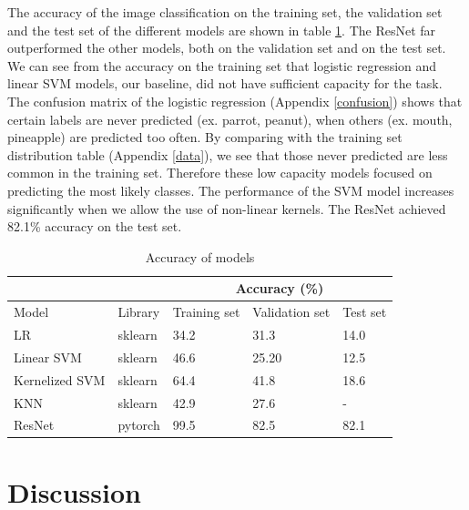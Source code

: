 \documentclass[reqno]{amsart}
\begin{document}
The accuracy of the image classification on the training set, the validation set and the test set of the different models are shown in table \ref{fig:results}. The ResNet far outperformed the other models, both on the validation set and on the test set. We can see from the accuracy on the training set that logistic regression and linear SVM models, our baseline, did not have sufficient capacity for the task. \\

The confusion matrix of the logistic regression (Appendix \ref{confusion}) shows that certain labels are never predicted (ex. parrot, peanut), when others (ex. mouth, pineapple) are predicted too often. By comparing with the training set distribution table (Appendix \ref{data}), we see that those never predicted are less common in the training set. Therefore these low capacity models focused on predicting the most likely classes. The performance of the SVM model increases significantly when we allow the use of non-linear kernels. The ResNet achieved 82.1\% accuracy on the test set.

\begin{table}
\caption {Accuracy of models} \label{fig:results}
\begin{center}
\begin{tabular}{|l|l|l|l|l|}
    \hline
    &&\multicolumn{3}{|c|}{Accuracy (\%)}\\
    \hline
    Model & Library & Training set & Validation set & Test set\\
    \hline \hline
     LR & sklearn & 34.2 & 31.3 & 14.0\\
     Linear SVM & sklearn & 46.6 & 25.20 & 12.5 \\
     Kernelized SVM & sklearn & 64.4 & 41.8 & 18.6 \\
     KNN & sklearn & 42.9 & 27.6 & - \\
     ResNet & pytorch & 99.5 & 82.5 & 82.1 \\
     \hline
\end{tabular}
\end{center}
\end{table}

\section{Discussion}
\label{Discussion}
\end{document}
